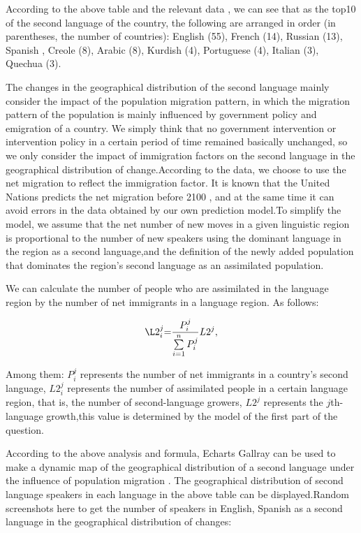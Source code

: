 \par According to the above table and the relevant data , we can see that as the top10 of the second language of the country, the following are arranged in order (in parentheses, the number of countries): English (55), French (14), Russian (13), Spanish , Creole (8), Arabic (8), Kurdish (4), Portuguese (4), Italian (3), Quechua (3).
\par The changes in the geographical distribution of the second language mainly consider the impact of the population migration pattern, in which the migration pattern of the population is mainly influenced by government policy and emigration of a country. We simply think that no government intervention or intervention policy in a certain period of time remained basically unchanged, so we only consider the impact of immigration factors on the second language in the geographical distribution of change.According to the data, we choose to use the net migration to reflect the immigration factor. It is known that the United Nations predicts the net migration before 2100 , and at the same time it can avoid errors in the data obtained by our own prediction model.To simplify the model, we assume that the net number of new moves in a given linguistic region is proportional to the number of new speakers using the dominant language in the region as a second language,and the definition of the newly added population that dominates the region's second language as an assimilated population.
\par We can calculate the number of people who are assimilated in the language region by the number of net immigrants in a language region. As follows:

\begin{equation}
\L2_i^j{\rm{ = }}\frac{{P_i^j}}{{\sum\limits_{i = 1}^n {P_i^j} }}L{2^j},\label{aa1}
\end{equation}

\noindent Among them: $P_i^j$ represents the number of net immigrants in a country's second language, $L2_i^j$ represents the number of assimilated people in a certain language region, that is, the number of second-language growers, $L{2^j}$ represents the $j$th-language growth,this value is determined by the model of the first part of the question.
\par According to the above analysis and formula, Echarts Gallray can be used to make a dynamic map of the geographical distribution of a second language under the influence of population migration . The geographical distribution of second language speakers in each language in the above table can be displayed.Random screenshots here to get the number of speakers in English, Spanish as a second language in the geographical distribution of changes:

